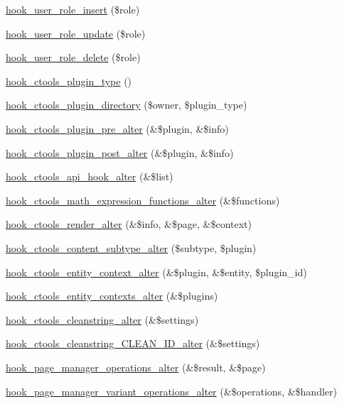 \begin{DoxyCompactItemize}
\item 
\hyperlink{group__hooks_ga79141c13b24e953eac78d810b530e96e}{hook\_\-user\_\-role\_\-insert} (\$role)
\item 
\hyperlink{group__hooks_ga4c71374906f72f8a80b0c954202f86da}{hook\_\-user\_\-role\_\-update} (\$role)
\item 
\hyperlink{group__hooks_gaf2a69f678861a227e36de13b87c340a7}{hook\_\-user\_\-role\_\-delete} (\$role)
\item 
\hyperlink{group__hooks_gacb27d27849a3374ddda0120603d549ac}{hook\_\-ctools\_\-plugin\_\-type} ()
\item 
\hyperlink{group__hooks_gaf17a0de7a7ca6e6c30c766ea1e44715e}{hook\_\-ctools\_\-plugin\_\-directory} (\$owner, \$plugin\_\-type)
\item 
\hyperlink{group__hooks_ga4ae530d112605c111f7bdead789ed91d}{hook\_\-ctools\_\-plugin\_\-pre\_\-alter} (\&\$plugin, \&\$info)
\item 
\hyperlink{group__hooks_ga2f8a7bad70a9bcb0748a13463a32d362}{hook\_\-ctools\_\-plugin\_\-post\_\-alter} (\&\$plugin, \&\$info)
\item 
\hyperlink{group__hooks_gad31fa7973a09a182d52fc1bda3bd95a0}{hook\_\-ctools\_\-api\_\-hook\_\-alter} (\&\$list)
\item 
\hyperlink{group__hooks_ga133fb5b53380291a3348feffb3dd3364}{hook\_\-ctools\_\-math\_\-expression\_\-functions\_\-alter} (\&\$functions)
\item 
\hyperlink{group__hooks_ga512e53c159fc6ea771d23b52d54b2f6a}{hook\_\-ctools\_\-render\_\-alter} (\&\$info, \&\$page, \&\$context)
\item 
\hyperlink{group__hooks_ga095e4e5a15a03861b5e708e3454bf154}{hook\_\-ctools\_\-content\_\-subtype\_\-alter} (\$subtype, \$plugin)
\item 
\hyperlink{group__hooks_gad8e0232b98d84d2347a3cc1e26c3df09}{hook\_\-ctools\_\-entity\_\-context\_\-alter} (\&\$plugin, \&\$entity, \$plugin\_\-id)
\item 
\hyperlink{group__hooks_gadc7f17dbf80ddbe90f66e7e9a0abb350}{hook\_\-ctools\_\-entity\_\-contexts\_\-alter} (\&\$plugins)
\item 
\hyperlink{group__hooks_ga8904abb33205b8553b560e08fd005e3a}{hook\_\-ctools\_\-cleanstring\_\-alter} (\&\$settings)
\item 
\hyperlink{group__hooks_gaa77de664d1ef915311e4f768eb6c62ea}{hook\_\-ctools\_\-cleanstring\_\-CLEAN\_\-ID\_\-alter} (\&\$settings)
\item 
\hyperlink{group__hooks_gadade57abdccc892f62ed6bc7f089ca29}{hook\_\-page\_\-manager\_\-operations\_\-alter} (\&\$result, \&\$page)
\item 
\hyperlink{group__hooks_gaf5d4ce054cae22b3bdca52011c6e8fbc}{hook\_\-page\_\-manager\_\-variant\_\-operations\_\-alter} (\&\$operations, \&\$handler)
\end{DoxyCompactItemize}
